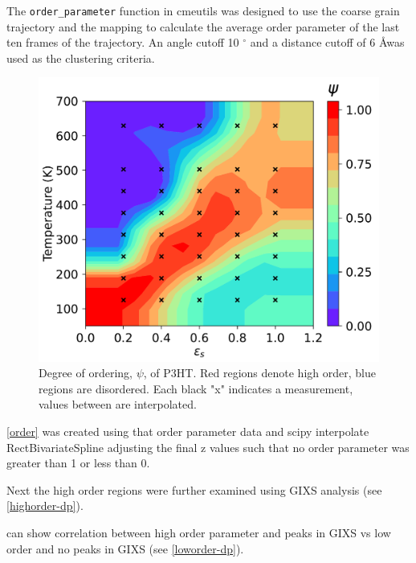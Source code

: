 The \lstinline{order_parameter} function in cmeutils was designed to use the coarse grain trajectory and the mapping to calculate the average order parameter of the last ten frames of the trajectory. An angle cutoff 10 $^{\circ}$ and a distance cutoff of 6 \AA was used as the clustering criteria.

\begin{figure}
    \centering
    \includegraphics[width=0.8\linewidth]{figures/p3ht_val/order_parameter.pdf}
    \caption{Degree of ordering, $\psi$, of P3HT. Red regions denote high order, blue regions are disordered. Each black "x" indicates a measurement, values between are interpolated.}\label{order} %
\end{figure}

\autoref{order} was created using that order parameter data and scipy interpolate RectBivariateSpline adjusting the final z values such that no order parameter was greater than 1 or less than 0.

Next the high order regions were further examined using GIXS analysis (see \autoref{highorder-dp}).

can show correlation between high order parameter and peaks in GIXS vs low order and no peaks in GIXS (see \autoref{loworder-dp}).

